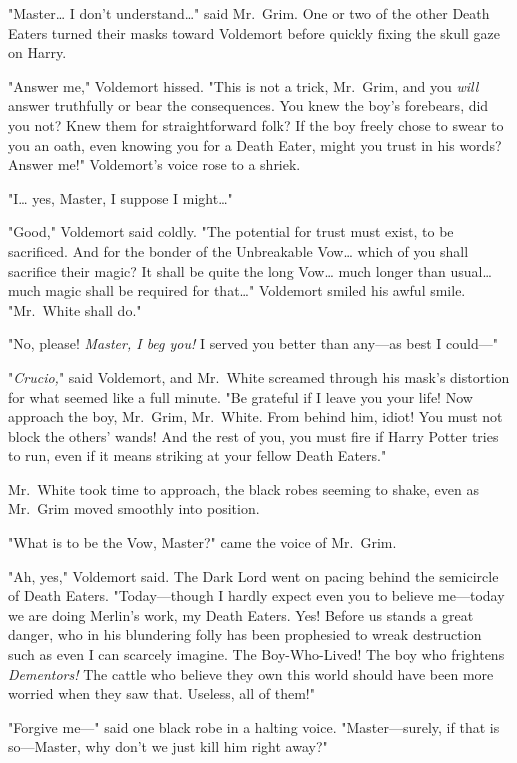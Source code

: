"Master{\ldots} I don't understand{\ldots}" said Mr.~Grim. One or two of the
other Death Eaters turned their masks toward Voldemort before quickly fixing
the skull gaze on Harry.

"Answer me," Voldemort hissed. "This is not a trick, Mr.~Grim, and you
\emph{will} answer truthfully or bear the consequences. You knew the boy's
forebears, did you not? Knew them for straightforward folk? If the boy freely
chose to swear to you an oath, even knowing you for a Death Eater, might you
trust in his words? Answer me!" Voldemort's voice rose to a shriek.

"I{\ldots} yes, Master, I suppose I might{\ldots}"

"Good," Voldemort said coldly. "The potential for trust must exist, to be
sacrificed. And for the bonder of the Unbreakable Vow{\ldots} which of you
shall sacrifice their magic? It shall be quite the long Vow{\ldots} much longer
than usual{\ldots} much magic shall be required for that{\ldots}" Voldemort
smiled his awful smile. "Mr.~White shall do."

"No, please! \emph{Master, I beg you!} I served you better than any---as best I
could---"

"\emph{Crucio,}" said Voldemort, and Mr.~White screamed through his mask's
distortion for what seemed like a full minute. "Be grateful if I leave you your
life! Now approach the boy, Mr.~Grim, Mr.~White. From behind him, idiot! You
must not block the others' wands! And the rest of you, you must fire if Harry
Potter tries to run, even if it means striking at your fellow Death Eaters."

Mr.~White took time to approach, the black robes seeming to shake, even as
Mr.~Grim moved smoothly into position.

"What is to be the Vow, Master?" came the voice of Mr.~Grim.

"Ah, yes," Voldemort said. The Dark Lord went on pacing behind the semicircle
of Death Eaters. "Today---though I hardly expect even you to believe me---today
we are doing Merlin's work, my Death Eaters. Yes! Before us stands a great
danger, who in his blundering folly has been prophesied to wreak destruction
such as even I can scarcely imagine. The Boy-Who-Lived! The boy who frightens
\emph{Dementors!} The cattle who believe they own this world should have been
more worried when they saw that. Useless, all of them!"

"Forgive me---" said one black robe in a halting voice. "Master---surely, if
that is so---Master, why don't we just kill him right away?"

